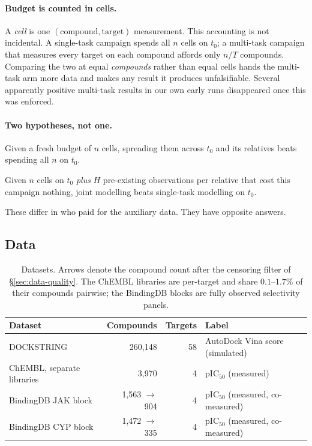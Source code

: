 \documentclass[11pt]{article}
\begin{document}
\paragraph{Budget is counted in cells.} A \emph{cell} is one
$(\text{compound}, \text{target})$ measurement. This accounting is not
incidental. A single-task campaign spends all $n$ cells on $t_0$; a multi-task
campaign that measures every target on each compound affords only $n/T$
compounds. Comparing the two at equal \emph{compounds} rather than equal cells
hands the multi-task arm more data and makes any result it produces
unfalsifiable. Several apparently positive multi-task results in our own early
runs disappeared once this was enforced.

\paragraph{Two hypotheses, not one.}
\begin{description}[leftmargin=2em,style=nextline]
  \item[budget-splitting] Given a fresh budget of $n$ cells, spreading them across
    $t_0$ and its relatives beats spending all $n$ on $t_0$.
  \item[borrowed-history] Given $n$ cells on $t_0$ \emph{plus} $H$ pre-existing
    observations per relative that cost this campaign nothing, joint modelling
    beats single-task modelling on $t_0$.
\end{description}
These differ in who paid for the auxiliary data. They have opposite answers.

\subsection{Data}

\begin{table}[ht]
\centering\small
\begin{tabular}{lrrl}
\toprule
Dataset & Compounds & Targets & Label \\
\midrule
DOCKSTRING            & 260{,}148 & 58 & AutoDock Vina score (simulated) \\
ChEMBL, separate libraries & 3{,}970  & 4 & pIC$_{50}$ (measured) \\
BindingDB JAK block   & 1{,}563 $\to$ 904 & 4 & pIC$_{50}$ (measured, co-measured) \\
BindingDB CYP block   & 1{,}472 $\to$ 335 & 4 & pIC$_{50}$ (measured, co-measured) \\
\bottomrule
\end{tabular}
\caption{Datasets. Arrows denote the compound count after the censoring filter
of \S\ref{sec:data-quality}. The ChEMBL libraries are per-target and share
$0.1$--$1.7\%$ of their compounds pairwise; the BindingDB blocks are fully
observed selectivity panels.}
\label{tab:data}
\end{table}
\end{document}
